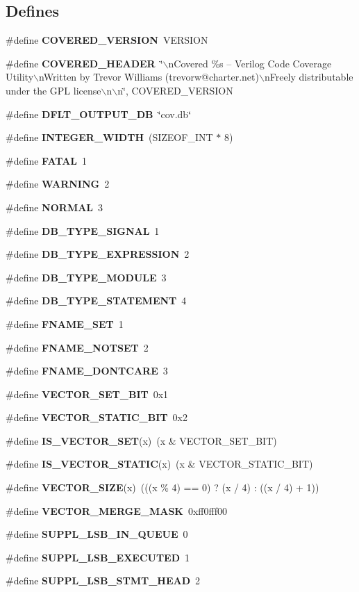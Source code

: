 \subsection*{Defines}
\begin{CompactItemize}
\item 
\#define {\bf COVERED\_\-VERSION}\ VERSION
\item 
\#define {\bf COVERED\_\-HEADER}\ \char`\"{}$\backslash$n\-Covered \%s -- Verilog Code Coverage Utility$\backslash$n\-Written by Trevor Williams  (trevorw@charter.net)$\backslash$n\-Freely distributable under the GPL license$\backslash$n$\backslash$n\char`\"{}, COVERED\_\-VERSION
\item 
\#define {\bf DFLT\_\-OUTPUT\_\-DB}\ \char`\"{}cov.db\char`\"{}
\item 
\#define {\bf INTEGER\_\-WIDTH}\ (SIZEOF\_\-INT $\ast$ 8)
\item 
\#define {\bf FATAL}\ 1
\item 
\#define {\bf WARNING}\ 2
\item 
\#define {\bf NORMAL}\ 3
\item 
\#define {\bf DB\_\-TYPE\_\-SIGNAL}\ 1
\item 
\#define {\bf DB\_\-TYPE\_\-EXPRESSION}\ 2
\item 
\#define {\bf DB\_\-TYPE\_\-MODULE}\ 3
\item 
\#define {\bf DB\_\-TYPE\_\-STATEMENT}\ 4
\item 
\#define {\bf FNAME\_\-SET}\ 1
\item 
\#define {\bf FNAME\_\-NOTSET}\ 2
\item 
\#define {\bf FNAME\_\-DONTCARE}\ 3
\item 
\#define {\bf VECTOR\_\-SET\_\-BIT}\ 0x1
\item 
\#define {\bf VECTOR\_\-STATIC\_\-BIT}\ 0x2
\item 
\#define {\bf IS\_\-VECTOR\_\-SET}(x)\ (x \& VECTOR\_\-SET\_\-BIT)
\item 
\#define {\bf IS\_\-VECTOR\_\-STATIC}(x)\ (x \& VECTOR\_\-STATIC\_\-BIT)
\item 
\#define {\bf VECTOR\_\-SIZE}(x)\ (((x \% 4) == 0) ? (x / 4) : ((x / 4) + 1))
\item 
\#define {\bf VECTOR\_\-MERGE\_\-MASK}\ 0xff0fff00
\item 
\#define {\bf SUPPL\_\-LSB\_\-IN\_\-QUEUE}\ 0
\item 
\#define {\bf SUPPL\_\-LSB\_\-EXECUTED}\ 1
\item 
\#define {\bf SUPPL\_\-LSB\_\-STMT\_\-HEAD}\ 2

\end{CompactItemize}
